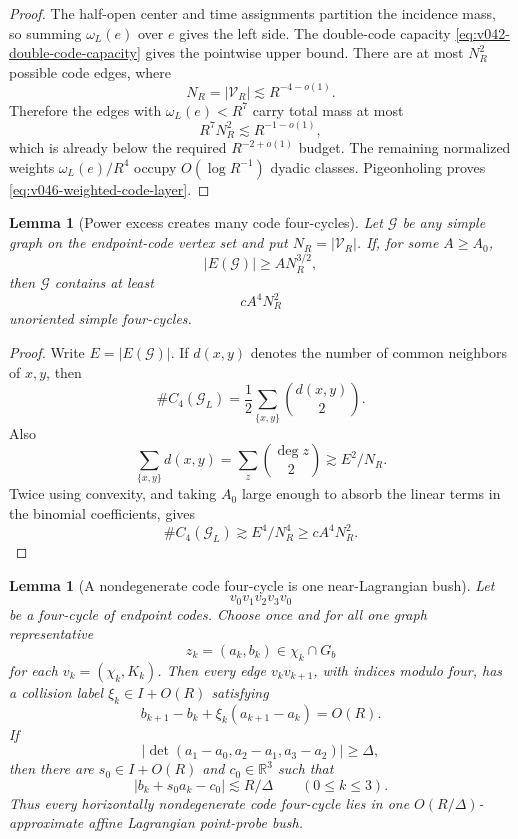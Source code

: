 \documentclass[10pt]{article}
\newtheorem{lemma}[theorem]{Lemma}
\newcommand{\R}{\mathbb R}
\begin{document}
\begin{proof}
The half-open center and time assignments partition the incidence mass, so summing
\(\omega_L(e)\) over \(e\) gives the left side.  The double-code capacity
\eqref{eq:v042-double-code-capacity} gives the pointwise upper bound.  There are at most
\(N_R^2\) possible code edges, where
\[
N_R=|\mathscr V_R|\lesssim R^{-4-o(1)}.
\]
Therefore the edges with \(\omega_L(e)<R^7\) carry total mass at most
\[
R^7N_R^2\lesssim R^{-1-o(1)},
\]
which is already below the required \(R^{-2+o(1)}\) budget.  The remaining normalized weights
\(\omega_L(e)/R^4\) occupy \(O(\log R^{-1})\) dyadic classes.  Pigeonholing proves
\eqref{eq:v046-weighted-code-layer}.
\end{proof}

\begin{lemma}[Power excess creates many code four-cycles]
\label{lem:v046-code-cycle-supersaturation}
Let \(\mathscr G\) be any simple graph on the endpoint-code vertex set and put
\(N_R=|\mathscr V_R|\).  If, for some \(A\ge A_0\),
\[
|E(\mathscr G)|
\ge
A N_R^{3/2},
\]
then \(\mathscr G\) contains at least
\begin{equation}
\label{eq:v046-code-cycle-supersaturation}
\boxed{
cA^4N_R^2
}
\end{equation}
unoriented simple four-cycles.
\end{lemma}

\begin{proof}
Write \(E=|E(\mathscr G)|\).  If \(d(x,y)\) denotes the number of common neighbors of \(x,y\), then
\[
\#C_4(\mathscr G_L)
=\frac12\sum_{\{x,y\}}\binom{d(x,y)}2.
\]
Also
\[
\sum_{\{x,y\}}d(x,y)=\sum_z\binom{\deg z}2
\gtrsim E^2/N_R.
\]
Twice using convexity, and taking \(A_0\) large enough to absorb the linear terms in the binomial
coefficients, gives
\[
\#C_4(\mathscr G_L)
\gtrsim E^4/N_R^4
\ge cA^4N_R^2.
\]
\end{proof}

\begin{lemma}[A nondegenerate code four-cycle is one near-Lagrangian bush]
\label{lem:v046-code-cycle-maslov-bush}
Let
\[
v_0v_1v_2v_3v_0
\]
be a four-cycle of endpoint codes.  Choose once and for all one graph representative
\[
z_k=(a_k,b_k)\in\chi_k\cap G_b
\]
for each \(v_k=(\chi_k,K_k)\).  Then every edge \(v_kv_{k+1}\), with indices modulo four, has a
collision label \(\xi_k\in I+O(R)\) satisfying
\begin{equation}
\label{eq:v046-code-cycle-contact}
\boxed{
b_{k+1}-b_k+\xi_k(a_{k+1}-a_k)=O(R).
}
\end{equation}
If
\[
\left|
\det(a_1-a_0,a_2-a_1,a_3-a_2)
\right|
\ge\Delta,
\]
then there are \(s_0\in I+O(R)\) and \(c_0\in\R^3\) such that
\begin{equation}
\label{eq:v046-code-cycle-bush}
\boxed{
|b_k+s_0a_k-c_0|
\lesssim
R/\Delta
\qquad(0\le k\le3).
}
\end{equation}
Thus every horizontally nondegenerate code four-cycle lies in one
\(O(R/\Delta)\)-approximate affine Lagrangian point-probe bush.
\end{lemma}
\end{document}
